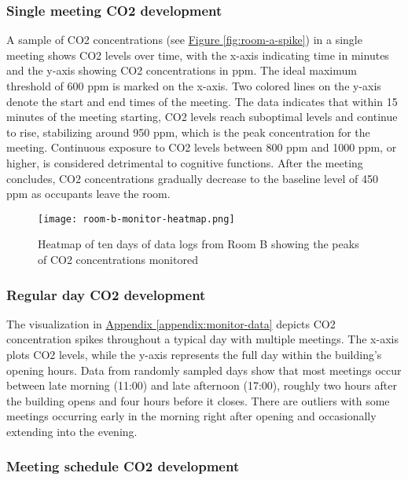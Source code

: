 \subsubsection{Single meeting CO2 development}

A sample of CO2 concentrations (see \hyperref[fig:room-a-spike]{Figure \ref*{fig:room-a-spike}}) in a single meeting shows CO2 levels over time, with the x-axis indicating time in minutes and the y-axis showing CO2 concentrations in ppm. The ideal maximum threshold of 600 ppm is marked on the x-axis. Two colored lines on the y-axis denote the start and end times of the meeting. The data indicates that within 15 minutes of the meeting starting, CO2 levels reach suboptimal levels and continue to rise, stabilizing around 950 ppm, which is the peak concentration for the meeting. Continuous exposure to CO2 levels between 800 ppm and 1000 ppm, or higher, is considered detrimental to cognitive functions. After the meeting concludes, CO2 concentrations gradually decrease to the baseline level of 450 ppm as occupants leave the room.

\begin{figure}[h]
    \centering
    \texttt{[image: room-b-monitor-heatmap.png]}
    \caption{Heatmap of ten days of data logs from Room B showing the peaks of CO2 concentrations monitored }
    \label{fig:room-b-heatmap-chart}
\end{figure}

\subsubsection{Regular day CO2 development}

The visualization in \hyperref[appendix:monitor-data]{Appendix \ref*{appendix:monitor-data}} depicts CO2 concentration spikes throughout a typical day with multiple meetings. The x-axis plots CO2 levels, while the y-axis represents the full day within the building’s opening hours. Data from randomly sampled days show that most meetings occur between late morning (11:00) and late afternoon (17:00), roughly two hours after the building opens and four hours before it closes. There are outliers with some meetings occurring early in the morning right after opening and occasionally extending into the evening.

\subsubsection{Meeting schedule CO2 development}

